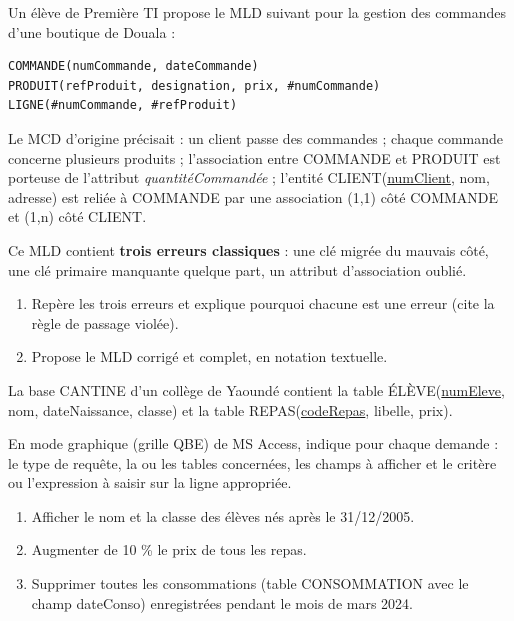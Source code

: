 \documentclass[11pt]{article}
\begin{document}
\begin{exercice}
Un élève de Première TI propose le MLD suivant pour la gestion des commandes d'une boutique de Douala :

\begin{lstlisting}
COMMANDE(numCommande, dateCommande)
PRODUIT(refProduit, designation, prix, #numCommande)
LIGNE(#numCommande, #refProduit)
\end{lstlisting}

Le MCD d'origine précisait : un client passe des commandes ; chaque commande concerne plusieurs produits ; l'association entre COMMANDE et PRODUIT est porteuse de l'attribut \emph{quantitéCommandée} ; l'entité CLIENT(\underline{numClient}, nom, adresse) est reliée à COMMANDE par une association (1,1) côté COMMANDE et (1,n) côté CLIENT.

Ce MLD contient \textbf{trois erreurs classiques} : une clé migrée du mauvais côté, une clé primaire manquante quelque part, un attribut d'association oublié.
\begin{enumerate}
  \item Repère les trois erreurs et explique pourquoi chacune est une erreur (cite la règle de passage violée).
  \item Propose le MLD corrigé et complet, en notation textuelle.
\end{enumerate}
\end{exercice}

\begin{exercice}
La base \og CANTINE \fg{} d'un collège de Yaoundé contient la table ÉLÈVE(\underline{numEleve}, nom, dateNaissance, classe) et la table REPAS(\underline{codeRepas}, libelle, prix).

En mode graphique (grille QBE) de MS Access, indique pour chaque demande : le type de requête, la ou les tables concernées, les champs à afficher et le critère ou l'expression à saisir sur la ligne appropriée.
\begin{enumerate}
  \item Afficher le nom et la classe des élèves nés après le 31/12/2005.
  \item Augmenter de 10 \% le prix de tous les repas.
  \item Supprimer toutes les consommations (table CONSOMMATION avec le champ dateConso) enregistrées pendant le mois de mars 2024.
\end{enumerate}
\end{exercice}
\end{document}
